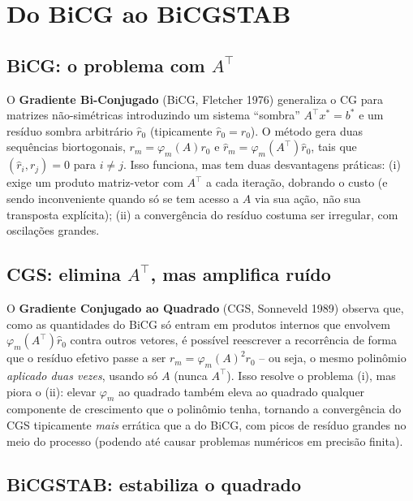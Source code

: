 \documentclass[11pt,a4paper]{article}
\begin{document}
\section{Do BiCG ao BiCGSTAB}

\subsection{BiCG: o problema com \texorpdfstring{$A^\top$}{A transposta}}

O \textbf{Gradiente Bi-Conjugado} (BiCG, Fletcher 1976) generaliza o CG
para matrizes não-simétricas introduzindo um sistema ``sombra''
$A^\top x^\ast = b^\ast$ e um resíduo sombra arbitrário $\hat r_0$
(tipicamente $\hat r_0 = r_0$). O método gera duas sequências
biortogonais, $r_m = \varphi_m(A) r_0$ e $\hat r_m =
\varphi_m(A^\top)\hat r_0$, tais que $(\hat r_i, r_j) = 0$ para $i\ne
j$. Isso funciona, mas tem duas desvantagens práticas: (i) exige um
produto matriz-vetor com $A^\top$ a cada iteração, dobrando o custo (e
sendo inconveniente quando só se tem acesso a $A$ via sua ação, não
sua transposta explícita); (ii) a convergência do resíduo costuma ser
irregular, com oscilações grandes.

\subsection{CGS: elimina \texorpdfstring{$A^\top$}{A transposta}, mas amplifica ruído}

O \textbf{Gradiente Conjugado ao Quadrado} (CGS, Sonneveld 1989)
observa que, como as quantidades do BiCG só entram em produtos
internos que envolvem $\varphi_m(A^\top)\hat r_0$ contra outros
vetores, é possível reescrever a recorrência de forma que o resíduo
efetivo passe a ser $r_m = \varphi_m(A)^2 r_0$ -- ou seja, o mesmo
polinômio \emph{aplicado duas vezes}, usando só $A$ (nunca $A^\top$).
Isso resolve o problema (i), mas piora o (ii): elevar $\varphi_m$ ao
quadrado também eleva ao quadrado qualquer componente de crescimento
que o polinômio tenha, tornando a convergência do CGS tipicamente
\emph{mais} errática que a do BiCG, com picos de resíduo grandes no
meio do processo (podendo até causar problemas numéricos em precisão
finita).

\subsection{BiCGSTAB: estabiliza o quadrado}
\end{document}
